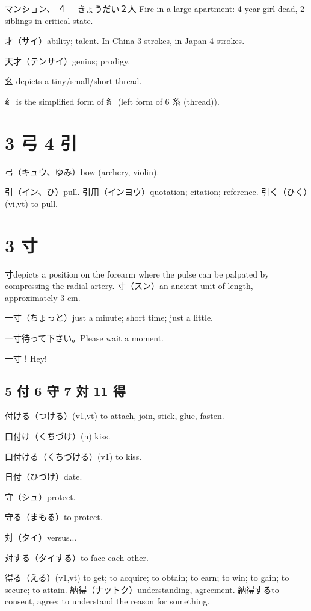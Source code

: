 マンション、%
４%
　きょうだい２人
Fire in a large apartment: 4-year girl dead, 2 siblings in critical state.

才（サイ）ability; talent.
In China 3 strokes, in Japan 4 strokes.

天才（テンサイ）genius; prodigy.

幺 depicts a tiny/small/short thread.

纟 is the simplified form of 糹
(left form of 6 糸 (thread)).

\section{3 弓 4 引}

弓（キュウ、ゆみ）bow (archery, violin).

引（イン、ひ）pull.
引用（インヨウ）quotation; citation; reference.
引く（ひく）(vi,vt) to pull.

\section{3 寸}

寸depicts a position on the forearm
where the pulse can be palpated by compressing the radial artery.
寸（スン）an ancient unit of length, approximately 3 cm.

一寸（ちょっと）just a minute; short time; just a little.

一寸待って下さい。Please wait a moment.

一寸！Hey!

\subsection{5 付 6 守 7 対 11 得}

付ける（つける）(v1,vt) to attach, join, stick, glue, fasten.

口付け（くちづけ）(n) kiss.

口付ける（くちづける）(v1) to kiss.

日付（ひづけ）date.

守（シュ）protect.

守る（まもる）to protect.

対（タイ）versus...

対する（タイする）to face each other.

得る（える）(v1,vt) to get; to acquire; to obtain; to earn; to win; to gain; to secure; to attain.
納得（ナットク）understanding, agreement.
納得するto consent, agree; to understand the reason for something.

